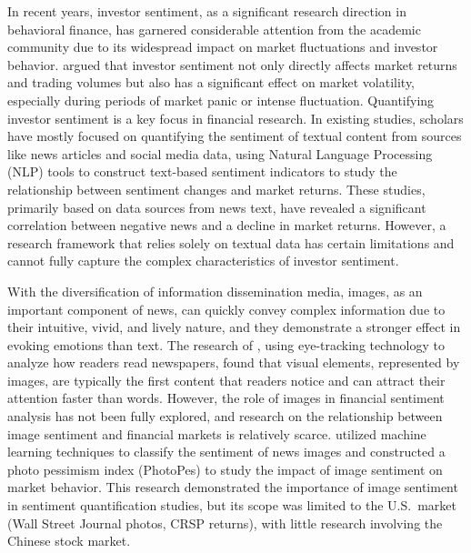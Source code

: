 \documentclass[AER]{AEA}
\begin{document}
\maketitle

In recent years, investor sentiment, as a significant research direction in behavioral finance, has garnered considerable attention from the academic community due to its widespread impact on market fluctuations and investor behavior. \citet{tetlock2007giving} argued that investor sentiment not only directly affects market returns and trading volumes but also has a significant effect on market volatility, especially during periods of market panic or intense fluctuation. Quantifying investor sentiment is a key focus in financial research. In existing studies, scholars have mostly focused on quantifying the sentiment of textual content from sources like news articles and social media data, using Natural Language Processing (NLP) tools to construct text-based sentiment indicators to study the relationship between sentiment changes and market returns. These studies, primarily based on data sources from news text, have revealed a significant correlation between negative news and a decline in market returns. However, a research framework that relies solely on textual data has certain limitations and cannot fully capture the complex characteristics of investor sentiment.

With the diversification of information dissemination media, images, as an important component of news, can quickly convey complex information due to their intuitive, vivid, and lively nature, and they demonstrate a stronger effect in evoking emotions than text. The research of \citet{garcia1991eyes}, using eye-tracking technology to analyze how readers read newspapers, found that visual elements, represented by images, are typically the first content that readers notice and can attract their attention faster than words. However, the role of images in financial sentiment analysis has not been fully explored, and research on the relationship between image sentiment and financial markets is relatively scarce. \citet{obaid2022picture} utilized machine learning techniques to classify the sentiment of news images and constructed a photo pessimism index (PhotoPes) to study the impact of image sentiment on market behavior. This research demonstrated the importance of image sentiment in sentiment quantification studies, but its scope was limited to the U.S.\ market (Wall Street Journal photos, CRSP returns), with little research involving the Chinese stock market.
\end{document}
